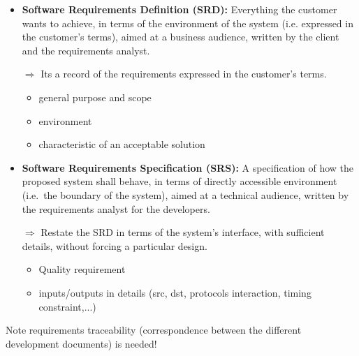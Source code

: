 \begin{itemize}

    \item \textbf{Software Requirements Definition (SRD):} Everything
        the customer wants to achieve, in terms of the environment of
        the system (i.e. expressed in the customer’s terms), aimed at a
        business audience, written by the client and the requirements
        analyst. 

        $\Rightarrow$ Its a record of the requirements expressed in the
        customer's terms.

        \begin{itemize}
            \item general purpose and scope 
            \item environment 
            \item characteristic of an acceptable solution
        \end{itemize}


\item \textbf{Software Requirements Specification (SRS):} A
    specification of how the proposed system shall behave, in terms of
    directly accessible environment (i.e.\ the boundary of the system),
    aimed at a technical audience, written by the requirements analyst
    for the developers.

    $\Rightarrow$  Restate the SRD in terms of the system’s interface,
    with sufficient details, without forcing a particular design.

    \begin{itemize}
            \item Quality requirement
            \item inputs/outputs in details (src, dst, protocols
                interaction, timing constraint,...)
                \end{itemize}

\end{itemize}


Note requirements traceability (correspondence between the different
development documents) is needed!
